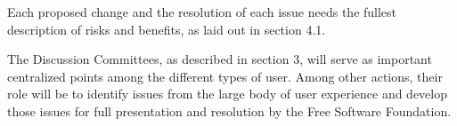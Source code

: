 Each proposed change and the resolution of each issue needs the
fullest description of risks and benefits, as laid out in section 4.1.

The Discussion Committees, as described in section 3, will serve as
important centralized points among the different types of user. Among
other actions, their role will be to identify issues from the large body
of user experience and develop those issues for full presentation and
resolution by the Free Software Foundation.
